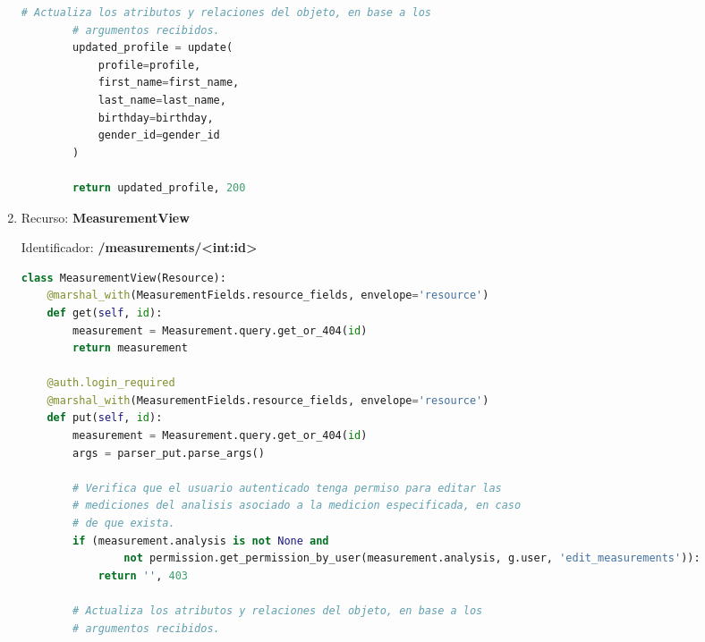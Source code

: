\documentclass[a4paper,12pt]{article}
\begin{document}
\begin{enumerate}
\begin{lstlisting}[language=Python]
        # Actualiza los atributos y relaciones del objeto, en base a los
        # argumentos recibidos.
        updated_profile = update(
            profile=profile,
            first_name=first_name,
            last_name=last_name,
            birthday=birthday,
            gender_id=gender_id
        )

        return updated_profile, 200
\end{lstlisting}

\item Recurso: \textbf{MeasurementView}

Identificador: \textbf{/measurements/<int:id>}

\begin{lstlisting}[language=Python]
class MeasurementView(Resource):
    @marshal_with(MeasurementFields.resource_fields, envelope='resource')
    def get(self, id):
        measurement = Measurement.query.get_or_404(id)
        return measurement

    @auth.login_required
    @marshal_with(MeasurementFields.resource_fields, envelope='resource')
    def put(self, id):
        measurement = Measurement.query.get_or_404(id)
        args = parser_put.parse_args()

        # Verifica que el usuario autenticado tenga permiso para editar las
        # mediciones del analisis asociado a la medicion especificada, en caso
        # de que exista.
        if (measurement.analysis is not None and
                not permission.get_permission_by_user(measurement.analysis, g.user, 'edit_measurements')):
            return '', 403

        # Actualiza los atributos y relaciones del objeto, en base a los
        # argumentos recibidos.


\end{lstlisting}
\end{enumerate}
\end{document}
